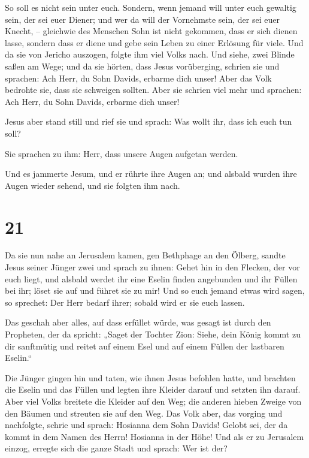  So soll es nicht sein unter euch. Sondern, wenn jemand
will unter euch gewaltig sein, der sei euer Diener;  und
wer da will der Vornehmste sein, der sei euer Knecht, -- 
gleichwie des Menschen Sohn ist nicht gekommen, dass er sich dienen
lasse, sondern dass er diene und gebe sein Leben zu einer Erlösung für
viele.  Und da sie von Jericho auszogen, folgte ihm viel
Volks nach.  Und siehe, zwei Blinde saßen am Wege; und da
sie hörten, dass Jesus vorüberging, schrien sie und sprachen: Ach Herr,
du Sohn Davids, erbarme dich unser!  Aber das Volk
bedrohte sie, dass sie schweigen sollten. Aber sie schrien viel mehr und
sprachen: Ach Herr, du Sohn Davids, erbarme dich unser!

 Jesus aber stand still und rief sie und sprach: Was
wollt ihr, dass ich euch tun soll?

 Sie sprachen zu ihm: Herr, dass unsere Augen aufgetan
werden.

 Und es jammerte Jesum, und er rührte ihre Augen an; und
alsbald wurden ihre Augen wieder sehend, und sie folgten ihm nach.

\hypertarget{section-20}{%
\section{21}\label{section-20}}

 Da sie nun nahe an Jerusalem kamen, gen Bethphage an den
Ölberg, sandte Jesus seiner Jünger zwei  und sprach zu
ihnen: Gehet hin in den Flecken, der vor euch liegt, und alsbald werdet
ihr eine Eselin finden angebunden und ihr Füllen bei ihr; löset sie auf
und führet sie zu mir!  Und so euch jemand etwas wird
sagen, so sprechet: Der Herr bedarf ihrer; sobald wird er sie euch
lassen.

 Das geschah aber alles, auf dass erfüllet würde, was
gesagt ist durch den Propheten, der da spricht:  „Saget
der Tochter Zion: Siehe, dein König kommt zu dir sanftmütig und reitet
auf einem Esel und auf einem Füllen der lastbaren Eselin.``

 Die Jünger gingen hin und taten, wie ihnen Jesus befohlen
hatte,  und brachten die Eselin und das Füllen und legten
ihre Kleider darauf und setzten ihn darauf.  Aber viel
Volks breitete die Kleider auf den Weg; die anderen hieben Zweige von
den Bäumen und streuten sie auf den Weg.  Das Volk aber,
das vorging und nachfolgte, schrie und sprach: Hosianna dem Sohn Davids!
Gelobt sei, der da kommt in dem Namen des Herrn! Hosianna in der Höhe!
 Und als er zu Jerusalem einzog, erregte sich die ganze
Stadt und sprach: Wer ist der?

